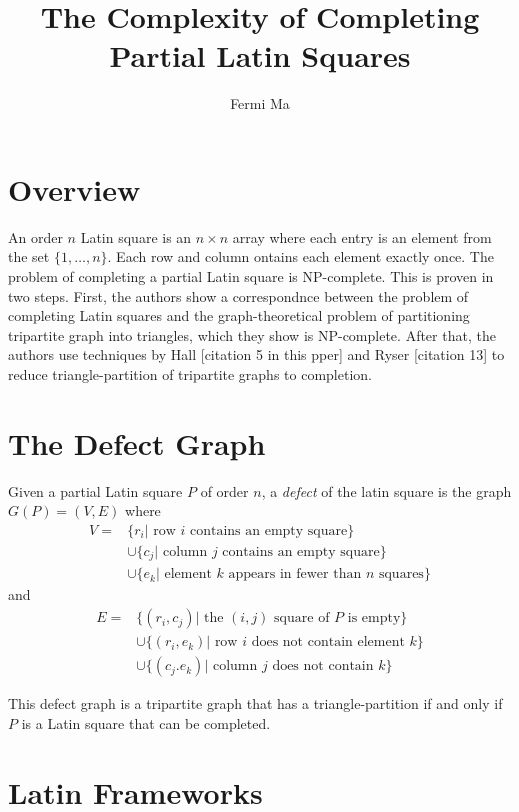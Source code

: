\documentclass[11pt]{article}
\author{Fermi Ma}
\title{The Complexity of Completing Partial Latin Squares}
\begin{document}
\maketitle

\section{Overview}

An order $n$ Latin square is an $n \times n$ array where each entry is an element from the set $\{1,\dots,n\}$. Each row and column ontains each element exactly once. The problem of completing a partial Latin square is NP-complete. This is proven in two steps. First, the authors show a correspondnce between the problem of completing Latin squares and the graph-theoretical problem of partitioning tripartite graph into triangles, which they show is NP-complete. After that, the authors use techniques by Hall [citation 5 in this pper] and Ryser [citation 13] to reduce triangle-partition of tripartite graphs to completion.

\section{The Defect Graph}

Given a partial Latin square $P$ of order $n$, a \emph{defect} of the latin square is the graph $G(P) = (V,E)$ where
\begin{align*}
V = &\{r_i | \text{ row }i\text{ contains an empty square}\} \\
&\cup \{c_j | \text{ column }j\text{ contains an empty square}\} \\
&\cup \{e_k | \text{ element }k\text{ appears in fewer than }n\text{ squares}\}
\end{align*}
and 
\begin{align*}
E = &\{(r_i,c_j) | \text{ the }(i,j)\text{ square of }P\text{ is empty}\} \\
&\cup \{(r_i,e_k) | \text{ row }i\text{ does not contain element }k\} \\
&\cup \{(c_j.e_k) | \text{ column }j\text{ does not contain }k\}
\end{align*}

This defect graph is a tripartite graph that has a triangle-partition if and only if $P$ is a Latin square that can be completed.

\section{Latin Frameworks}
\end{document}
